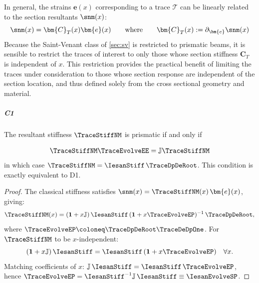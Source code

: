 In general, the strains \(\bm{e}(x)\) corresponding to a trace \(\mathcal{T}\) can be linearly related to the section resultants \(\snm(x)\):
\begin{equation*}
\snm(x) = \bm{C}_T(x)\bm{e}(x)
\qquad\text{where}\qquad 
\bm{C}_T(x) := \partial_{\bm{e}}\snm(x)
\end{equation*}
Because the Saint-Venant class of \cref{sec:sv} is restricted to prismatic beams, 
it is sensible to restrict the traces of interest to only those whose section stiffness \(\bm{C}_T\) is independent of $x$. 
This restriction provides the practical benefit of limiting the traces under consideration to those whose section response are independent of the section location, and thus defined solely from the cross sectional geometry and material. 




\subparagraph{C1}
\begin{proposition}
The resultant stiffness $\TraceStiffNM$ is prismatic if and only if

\begin{equation}
\TraceStiffNM\TraceEvolveEE = \mathbb{J}\TraceStiffNM
\label{eq:cj-cj}
\end{equation}
in which case $\TraceStiffNM = \IesanStiff\,\TraceDpDeRoot$. 
This condition is exactly equivalent to D1.
\end{proposition}

\begin{proof}
The classical stiffness satisfies $\snm(x) = \TraceStiffNM(x)\,\bm{e}(x)$, giving:
\begin{equation*}
\TraceStiffNM(x) = (\mathbf{1} + x\mathbb{J})\,\IesanStiff\,
(\mathbf{1} + x\TraceEvolveEP)^{-1}\,\TraceDpDeRoot,
\end{equation*}
where $\TraceEvolveEP \coloneq \TraceDpDeRoot\TraceDeDpOne$. For $\TraceStiffNM$ to be 
$x$-independent:
\begin{equation*}
(\mathbf{1} + x\mathbb{J})\,\IesanStiff = \IesanStiff\,(\mathbf{1} + x\TraceEvolveEP) 
\quad \forall x.
\end{equation*}
Matching coefficients of $x$: $\mathbb{J}\,\IesanStiff = \IesanStiff\,\TraceEvolveEP$, 
hence $\TraceEvolveEP = \IesanStiff^{-1}\mathbb{J}\,\IesanStiff \equiv \IesanEvolveSP$.
\end{proof}


